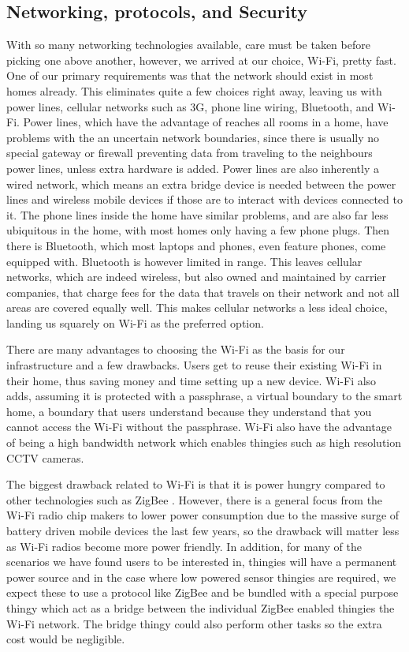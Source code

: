\documentclass{ubicomp2012}
\begin{document}
\subsection{Networking, protocols, and Security}

With so many networking technologies available, care must be taken before picking one above another, however, we arrived at our choice, Wi-Fi, pretty fast. One of our primary requirements was that the network should exist in most homes already. This eliminates quite a few choices right away, leaving us with power lines, cellular networks such as 3G, phone line wiring, Bluetooth, and Wi-Fi. Power lines, which have the advantage of reaches all rooms in a home, have problems with the an uncertain network boundaries, since there is usually no special gateway or firewall preventing data from traveling to the neighbours power lines, unless extra hardware is added. Power lines are also inherently a wired network, which means an extra bridge device is needed between the power lines and wireless mobile devices if those are to interact with devices connected to it. The phone lines inside the home have similar problems, and are also far less ubiquitous in the home, with most homes only having a few phone plugs. Then there is Bluetooth, which most laptops and phones, even feature phones, come equipped with. Bluetooth is however limited in range. This leaves cellular networks, which are indeed wireless, but also owned and maintained by carrier companies, that charge fees for the data that travels on their network and not all areas are covered equally well. This makes cellular networks a less ideal choice, landing us squarely on Wi-Fi as the preferred option.

There are many advantages to choosing the Wi-Fi as the basis for our infrastructure and a few drawbacks. Users get to reuse their existing Wi-Fi in their home, thus saving money and time setting up a new device. Wi-Fi also adds, assuming it is protected with a passphrase, a virtual boundary to the smart home, a boundary that users understand because they understand that you cannot access the Wi-Fi without the passphrase. Wi-Fi also have the advantage of being a high bandwidth network which enables thingies such as high resolution CCTV cameras.

The biggest drawback related to Wi-Fi is that it is power hungry compared to other technologies such as ZigBee \cite{zigbeeWebsite}. However, there is a general focus from the Wi-Fi radio chip makers to lower power consumption due to the massive surge of battery driven mobile devices the last few years, so the drawback will matter less as Wi-Fi radios become more power friendly. In addition, for many of the scenarios we have found users to be interested in, thingies will have a permanent power source and in the case where low powered sensor thingies are required, we expect these to use a protocol like ZigBee \cite{zigbeeWebsite} and be bundled with a special purpose thingy which act as a bridge between the individual ZigBee enabled thingies the Wi-Fi network. The bridge thingy could also perform other tasks so the extra cost would be negligible.
\end{document}
